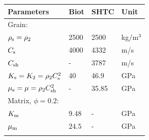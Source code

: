 \documentclass[3p,times,table]{article}
\newcommand{\tort}{{\mathcal{T}}}
\newcommand{\Km}{K_{\rm m}}
\newcommand{\Ks}{K_{\rm s}}
\newcommand{\mus}{\mu_{\rm s}}
\newcommand{\rhos}{\rho_{\rm s}}
\newcommand{\Cs}{C_{\rm s}}
\newcommand{\Csh}{C_{\rm sh}}
\begin{document}
\begin{table}[]
	\begin{center}
		\begin{tabular}{llll}
			\hline
			Parameters\hspace{1cm}                   & Biot\hspace{2cm} & 
			SHTC          & 
			Unit                           \\ \hline
			Grain:		& & &\\[1mm]
			\rowcolor[HTML]{ECF4FF} 
			$ \rhos = \rho_2 $      & 2500   &        2500             & kg/m$ 
			^3 
			$                      \\[1mm]
			\rowcolor[HTML]{CBCEFB} 
			$ \Cs  $     &  4000       &   4332        & 
			m/s                              \\[1mm]
			\rowcolor[HTML]{ECF4FF}
			$ \Csh  $  &  -       &   3787        & 
			m/s                              \\[1mm]
			\rowcolor[HTML]{CBCEFB} 
			$ \Ks = K_2 = \rho_2 \Cs^2 $  &   40       &   46.9        & 
			GPa      \\[1mm]
			\rowcolor[HTML]{ECF4FF}
			$ \mus = \mu = \rho_2 \Csh^2 $&   -       &  35.85        & GPa 
			\\[1mm]
			Matrix, $\phi =0.2$:		& & &\\[1mm]
			\rowcolor[HTML]{CBCEFB} 
			$ \Km $     & $ 9.48 $       &    -     & GPa                      
			\\[1mm]
			\rowcolor[HTML]{ECF4FF} 
			$ \mu_{\rm m} $     & $ 24.5 $       &    -     & 
			GPa                      \\[1mm]
			\rowcolor[HTML]{CBCEFB} 

\end{tabular}
\end{center}
\end{table}
\end{document}
